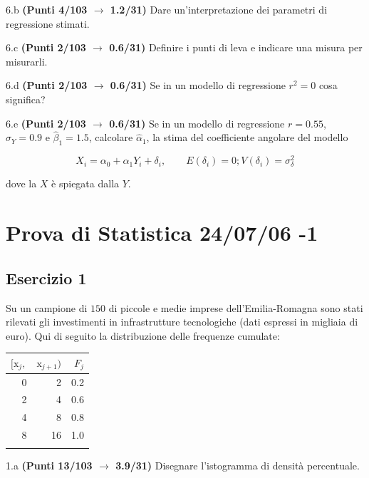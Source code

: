 \documentclass[
  11pt,
]{book}
\theoremstyle{mytheoremstyle}
\theoremstyle{mydefstyle}
\begin{document}
6.b \textbf{(Punti 4/103 \(\rightarrow\) 1.2/31)} Dare un'interpretazione dei parametri di regressione stimati.

6.c \textbf{(Punti 2/103 \(\rightarrow\) 0.6/31)} Definire i punti di leva e indicare una misura per misurarli.

6.d \textbf{(Punti 2/103 \(\rightarrow\) 0.6/31)} Se in un modello di regressione \(r^2=0\) cosa significa?

6.e \textbf{(Punti 2/103 \(\rightarrow\) 0.6/31)} Se in un modello di regressione \(r=0.55\), \(\hat\sigma_Y=0.9\) e \(\hat\beta_1=1.5\), calcolare
\(\hat\alpha_1\), la stima del coefficiente angolare del modello

\[
X_i = \alpha_0+\alpha_1 Y_i + \delta_i, \qquad E(\delta_i)=0; V(\delta_i)=\sigma_\delta^2
\]

dove la \(X\) è spiegata dalla \(Y\).

\section{Prova di Statistica 24/07/06 -1}\label{prova-di-statistica-240706--1}

\subsection{Esercizio 1}\label{esercizio-1-40}

Su un campione di \(150\) di piccole e medie imprese dell'Emilia-Romagna sono stati rilevati gli investimenti in infrastrutture tecnologiche (dati espressi in migliaia di euro). Qui di seguito la distribuzione delle frequenze cumulate:

\begin{table}[H]
\centering
\begin{tabular}{rrr}
\toprule
$[\text{x}_j,$ & $\text{x}_{j+1})$ & $F_j$\\
\midrule
0 & 2 & 0.2\\
2 & 4 & 0.6\\
4 & 8 & 0.8\\
8 & 16 & 1.0\\
 &  & \\
\bottomrule
\end{tabular}
\end{table}

1.a \textbf{(Punti 13/103 \(\rightarrow\) 3.9/31)} Disegnare l'istogramma di densità percentuale.
\end{document}
